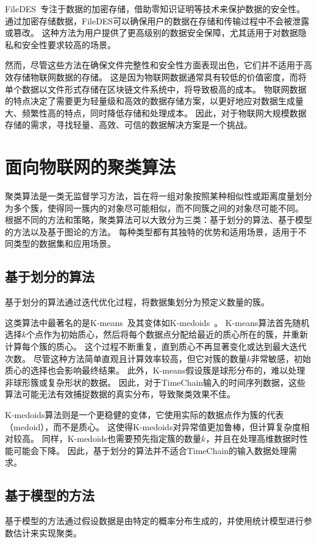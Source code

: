FileDES~\cite{xu2024filedes}专注于数据的加密存储，借助零知识证明等技术来保护数据的安全性。
通过加密存储数据，FileDES可以确保用户的数据在存储和传输过程中不会被泄露或篡改。
这种方法为用户提供了更高级别的数据安全保障，尤其适用于对数据隐私和安全性要求较高的场景。

然而，尽管这些方法在确保文件完整性和安全性方面表现出色，它们并不适用于高效存储物联网数据的存储。
这是因为物联网数据通常具有较低的价值密度，而将单个数据以文件形式存储在区块链文件系统中，将导致极高的成本。
物联网数据的特点决定了需要更为轻量级和高效的数据存储方案，以更好地应对数据生成量大、频繁性高的特点，同时降低存储和处理成本。
因此，对于物联网大规模数据存储的需求，寻找轻量、高效、可信的数据解决方案是一个挑战。

\section{面向物联网的聚类算法}
聚类算法是一类无监督学习方法，旨在将一组对象按照某种相似性或距离度量划分为多个簇，使得同一簇内的对象尽可能相似，而不同簇之间的对象尽可能不同。
根据不同的方法和策略，聚类算法可以大致分为三类：基于划分的算法、基于模型的方法以及基于图论的方法。
每种类型都有其独特的优势和适用场景，适用于不同类型的数据集和应用场景。

\subsection{基于划分的算法}
基于划分的算法通过迭代优化过程，将数据集划分为预定义数量的簇。

这类算法中最著名的是K-means~\cite{kanungo2002efficient}及其变体如K-medoids~\cite{park2009simple}。
K-means算法首先随机选择$k$个点作为初始质心，然后将每个数据点分配给最近的质心所在的簇，并重新计算每个簇的质心。
这个过程不断重复，直到质心不再显著变化或达到最大迭代次数。
尽管这种方法简单直观且计算效率较高，但它对簇的数量$k$非常敏感，初始质心的选择也会影响最终结果。
此外，K-means假设簇是球形分布的，难以处理非球形簇或复杂形状的数据。
因此，对于TimeChain输入的时间序列数据，这些算法可能无法有效捕捉数据的真实分布，导致聚类效果不佳。

K-medoids算法则是一个更稳健的变体，它使用实际的数据点作为簇的代表（medoid），而不是质心。
这使得K-medoids对异常值更加鲁棒，但计算复杂度相对较高。
同样，K-medoids也需要预先指定簇的数量$k$，并且在处理高维数据时性能可能会下降。
因此，基于划分的算法并不适合TimeChain的输入数据处理需求。

\subsection{基于模型的方法}
基于模型的方法通过假设数据是由特定的概率分布生成的，并使用统计模型进行参数估计来实现聚类。

